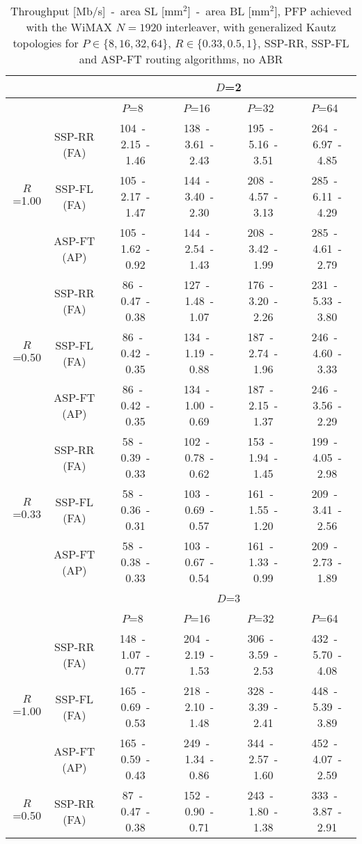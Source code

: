 \documentclass[10pt,twocolumn,journal]{IEEEtran}
\begin{document}
\begin{table*}[t!]
  \centering
  \caption{Throughput [Mb/s]~-~area SL [mm$^2$]~-~area BL [mm$^2$], PFP achieved with the WiMAX $N=1920$ interleaver, 
with generalized Kautz topologies for $P \in \{8, 16, 32, 64\}$, $R \in \{0.33, 0.5, 1\}$, SSP-RR, SSP-FL and ASP-FT routing algorithms, no ABR} 
  \label{tab:wimax}
   { \scriptsize
  \begin{tabular}{|c|c|c|c|c|c|}
\hline
& 	 & \multicolumn{4}{c|}{$D$=2} \\
\hline
& 	 & $P$=8 & $P$=16 & $P$=32 & $P$=64 \\
\hline
\multirow{3}{*}{$R$=1.00} & SSP-RR (FA) & 104~-~2.15~-~1.46 & 138~-~3.61~-~2.43 & 195~-~5.16~-~3.51 & 264~-~6.97~-~4.85 \\
& SSP-FL (FA) & 105~-~2.17~-~1.47 & 144~-~3.40~-~2.30 & 208~-~4.57~-~3.13 & 285~-~6.11~-~4.29 \\
& ASP-FT (AP) & 105~-~1.62~-~0.92 & 144~-~2.54~-~1.43 & 208~-~3.42~-~1.99 & 285~-~4.61~-~2.79 \\
\hline
\multirow{3}{*}{$R$=0.50} & SSP-RR (FA) & 86~-~0.47~-~0.38 & 127~-~1.48~-~1.07 & 176~-~3.20~-~2.26 & 231~-~5.33~-~3.80 \\
& SSP-FL (FA) & 86~-~0.42~-~0.35 & 134~-~1.19~-~0.88 & 187~-~2.74~-~1.96 & 246~-~4.60~-~3.33 \\
& ASP-FT (AP) & 86~-~0.42~-~0.35 & 134~-~1.00~-~0.69 & 187~-~2.15~-~1.37 & 246~-~3.56~-~2.29 \\
\hline
\multirow{3}{*}{$R$=0.33} & SSP-RR (FA) & 58~-~0.39~-~0.33 & 102~-~0.78~-~0.62 & 153~-~1.94~-~1.45 & 199~-~4.05~-~2.98 \\
& SSP-FL (FA) & 58~-~0.36~-~0.31 & 103~-~0.69~-~0.57 & 161~-~1.55~-~1.20 & 209~-~3.41~-~2.56 \\
& ASP-FT (AP) & 58~-~0.38~-~0.33 & 103~-~0.67~-~0.54 & 161~-~1.33~-~0.99 & 209~-~2.73~-~1.89 \\
\hline
\hline
& 	 & \multicolumn{4}{c|}{$D$=3} \\
\hline
& 	 & $P$=8 & $P$=16 & $P$=32 & $P$=64 \\
\hline
\multirow{3}{*}{$R$=1.00} & SSP-RR (FA) & 148~-~1.07~-~0.77 & 204~-~2.19~-~1.53 & 306~-~3.59~-~2.53 & 432~-~5.70~-~4.08 \\
& SSP-FL (FA) & 165~-~0.69~-~0.53 & 218~-~2.10~-~1.48 & 328~-~3.39~-~2.41 & 448~-~5.39~-~3.89 \\
& ASP-FT (AP) & 165~-~0.59~-~0.43 & 249~-~1.34~-~0.86 & 344~-~2.57~-~1.60 & 452~-~4.07~-~2.59 \\
\hline
\multirow{3}{*}{$R$=0.50} & SSP-RR (FA) & 87~-~0.47~-~0.38 & 152~-~0.90~-~0.71 & 243~-~1.80~-~1.38 & 333~-~3.87~-~2.91 \\

\end{tabular}}
\end{table*}
\end{document}
